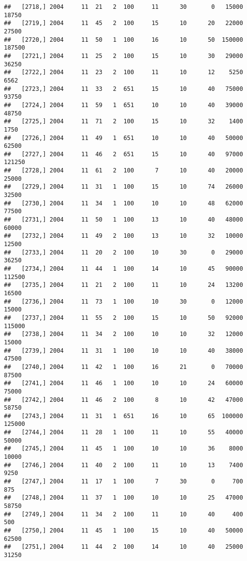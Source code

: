 \documentclass{article}\usepackage[]{graphicx}\usepackage[]{color}
\makeatletter
\newenvironment{kframe}{%
 \def\at@end@of@kframe{}%
 \ifinner\ifhmode%
  \def\at@end@of@kframe{\end{minipage}}%
  \begin{minipage}{\columnwidth}%
 \fi\fi%
 \def\FrameCommand##1{\hskip\@totalleftmargin \hskip-\fboxsep
 \colorbox{shadecolor}{##1}\hskip-\fboxsep
     \hskip-\linewidth \hskip-\@totalleftmargin \hskip\columnwidth}%
 \MakeFramed {\advance\hsize-\width
   \@totalleftmargin\z@ \linewidth\hsize
   \@setminipage}}%
 {\par\unskip\endMakeFramed%
 \at@end@of@kframe}
\newenvironment{knitrout}{}{} %
\makeatother
\begin{document}
\begin{knitrout}
\begin{kframe}
\begin{verbatim}
##   [2718,] 2004     11  21   2  100     11      30       0   15000   18750
##   [2719,] 2004     11  45   2  100     15      10      20   22000   27500
##   [2720,] 2004     11  50   1  100     16      10      50  150000  187500
##   [2721,] 2004     11  25   2  100     15      10      30   29000   36250
##   [2722,] 2004     11  23   2  100     11      10      12    5250    6562
##   [2723,] 2004     11  33   2  651     15      10      40   75000   93750
##   [2724,] 2004     11  59   1  651     10      10      40   39000   48750
##   [2725,] 2004     11  71   2  100     15      10      32    1400    1750
##   [2726,] 2004     11  49   1  651     10      10      40   50000   62500
##   [2727,] 2004     11  46   2  651     15      10      40   97000  121250
##   [2728,] 2004     11  61   2  100      7      10      40   20000   25000
##   [2729,] 2004     11  31   1  100     15      10      74   26000   32500
##   [2730,] 2004     11  34   1  100     10      10      48   62000   77500
##   [2731,] 2004     11  50   1  100     13      10      40   48000   60000
##   [2732,] 2004     11  49   2  100     13      10      32   10000   12500
##   [2733,] 2004     11  20   2  100     10      30       0   29000   36250
##   [2734,] 2004     11  44   1  100     14      10      45   90000  112500
##   [2735,] 2004     11  21   2  100     11      10      24   13200   16500
##   [2736,] 2004     11  73   1  100     10      30       0   12000   15000
##   [2737,] 2004     11  55   2  100     15      10      50   92000  115000
##   [2738,] 2004     11  34   2  100     10      10      32   12000   15000
##   [2739,] 2004     11  31   1  100     10      10      40   38000   47500
##   [2740,] 2004     11  42   1  100     16      21       0   70000   87500
##   [2741,] 2004     11  46   1  100     10      10      24   60000   75000
##   [2742,] 2004     11  46   2  100      8      10      42   47000   58750
##   [2743,] 2004     11  31   1  651     16      10      65  100000  125000
##   [2744,] 2004     11  28   1  100     11      10      55   40000   50000
##   [2745,] 2004     11  45   1  100     10      10      36    8000   10000
##   [2746,] 2004     11  40   2  100     11      10      13    7400    9250
##   [2747,] 2004     11  17   1  100      7      30       0     700     875
##   [2748,] 2004     11  37   1  100     10      10      25   47000   58750
##   [2749,] 2004     11  34   2  100     11      10      40     400     500
##   [2750,] 2004     11  45   1  100     15      10      40   50000   62500
##   [2751,] 2004     11  44   2  100     14      10      40   25000   31250

\end{verbatim}
\end{kframe}
\end{knitrout}
\end{document}
